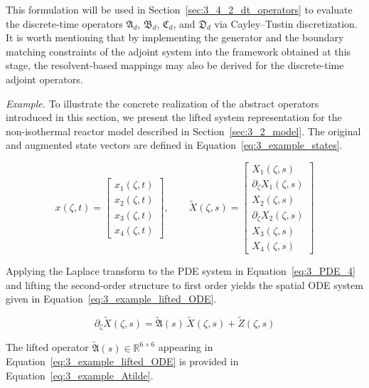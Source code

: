This formulation will be used in Section~\ref{sec:3_4_2_dt_operators} to evaluate the discrete-time operators $\mathfrak{A}_d$, $\mathfrak{B}_d$, $\mathfrak{C}_d$, and $\mathfrak{D}_d$ via Cayley--Tustin discretization. It is worth mentioning that by implementing the generator and the boundary matching constraints of the adjoint system into the framework obtained at this stage, the resolvent-based mappings may also be derived for the discrete-time adjoint operators.

\noindent\textit{Example.} To illustrate the concrete realization of the abstract operators introduced in this section, we present the lifted system representation for the non-isothermal reactor model described in Section~\ref{sec:3_2_model}. The original and augmented state vectors are defined in Equation~\eqref{eq:3_example_states}.

\begin{equation} \label{eq:3_example_states}
x(\zeta, t) =
\begin{bmatrix}
x_1(\zeta, t) \\
x_2(\zeta, t) \\
x_3(\zeta, t) \\
x_4(\zeta, t)
\end{bmatrix}, \qquad
\tilde{X}(\zeta, s) =
\begin{bmatrix}
X_1(\zeta, s) \\
\partial_\zeta X_1(\zeta, s) \\
X_2(\zeta, s) \\
\partial_\zeta X_2(\zeta, s) \\
X_3(\zeta, s) \\
X_4(\zeta, s)
\end{bmatrix}
\end{equation}

Applying the Laplace transform to the PDE system in Equation~\eqref{eq:3_PDE_4} and lifting the second-order structure to first order yields the spatial ODE system given in Equation~\eqref{eq:3_example_lifted_ODE}.

\begin{equation} \label{eq:3_example_lifted_ODE}
\partial_\zeta \tilde{X}(\zeta, s) = \tilde{\mathfrak{A}}(s)\, \tilde{X}(\zeta, s) + \tilde{Z}(\zeta, s)
\end{equation}

The lifted operator $\tilde{\mathfrak{A}}(s) \in \mathbb{R}^{6 \times 6}$ appearing in Equation~\eqref{eq:3_example_lifted_ODE} is provided in Equation~\eqref{eq:3_example_Atilde}.

